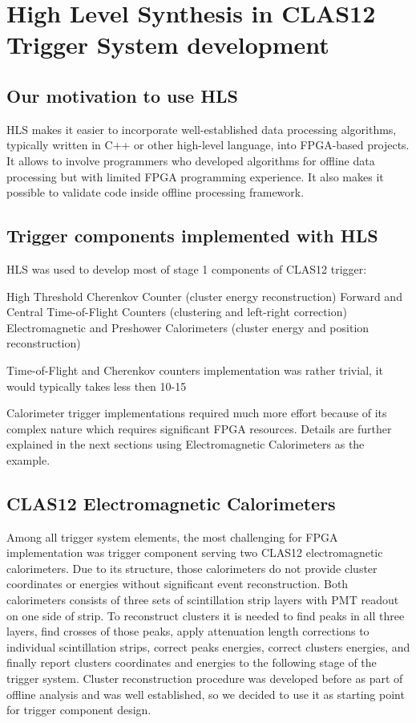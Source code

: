 \section{High Level Synthesis in CLAS12 Trigger System development}

\subsection{Our motivation to use HLS}

HLS makes it easier to incorporate well-established data processing algorithms, typically written in C++ or other high-level language, into FPGA-based projects.
It allows to involve programmers who developed algorithms for offline data processing but with limited FPGA programming experience. It also makes it possible to validate code inside offline processing framework.

\subsection{Trigger components implemented with HLS}

HLS was used to develop most of stage 1 components of CLAS12 trigger:

High Threshold Cherenkov Counter (cluster energy reconstruction)
Forward and Central Time-of-Flight Counters (clustering and left-right correction)
Electromagnetic and Preshower Calorimeters (cluster energy and position reconstruction)

Time-of-Flight and Cherenkov counters implementation was rather trivial, it would typically takes less then 10-15%

Calorimeter trigger implementations required much more effort because of its complex nature which requires significant FPGA resources. Details are further explained in the next sections using Electromagnetic Calorimeters as the example.


\subsection{CLAS12 Electromagnetic Calorimeters}

Among all trigger system elements, the most challenging for FPGA implementation was trigger component serving two CLAS12 electromagnetic calorimeters. Due to its structure, those calorimeters do not provide cluster coordinates or energies without significant event reconstruction. Both calorimeters consists of three sets of scintillation strip layers with PMT readout on one side of strip. To reconstruct clusters it is needed to find peaks in all three layers, find crosses of those peaks, apply attenuation length corrections to individual scintillation strips, correct peaks energies, correct clusters energies, and finally report clusters coordinates and energies to the following stage of the trigger system. Cluster reconstruction procedure was developed before as part of offline analysis and was well established, so we decided to use it as starting point for trigger component design.

